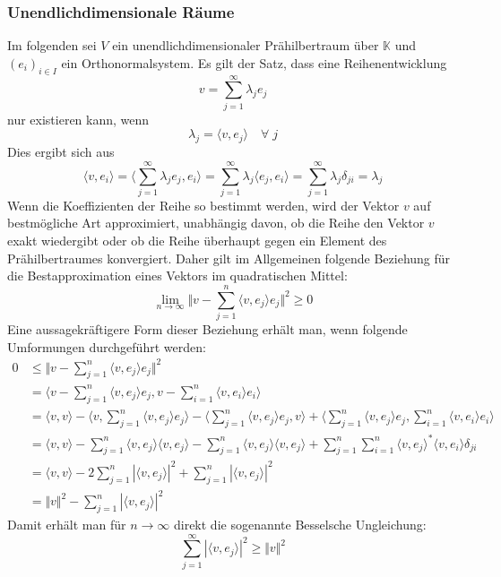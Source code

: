 \documentclass[9pt]{report}
\begin{document}
\subsubsection{Unendlichdimensionale Räume}
Im folgenden sei $V$ ein unendlichdimensionaler Prähilbertraum über $\mathbb{K}$ und $(e_i)_{i\in I}$ ein Orthonormalsystem. Es gilt der Satz, dass eine Reihenentwicklung
\begin{equation}
v=\sum_{j=1}^{\infty}\lambda_{j}e_{j}
\end{equation}
nur existieren kann, wenn
\begin{equation}
\lambda_{j}=\langle v, e_j\rangle\quad\forall\;j
\end{equation}
Dies ergibt sich aus
\begin{equation}
\langle v,e_i\rangle =\bigg\langle\sum_{j=1}^{\infty}\lambda_{j}e_{j},e_{i}\bigg\rangle =\sum_{j=1}^{\infty}\lambda_{j}\langle e_j,e_i\rangle =\sum_{j=1}^{\infty}\lambda_{j}\delta_{ji}=\lambda_j
\end{equation}
Wenn die Koeffizienten der Reihe so bestimmt werden, wird der Vektor $v$ auf bestmögliche Art approximiert, unabhängig davon, ob die Reihe den Vektor $v$ exakt wiedergibt oder ob die Reihe überhaupt gegen ein Element des Prähilbertraumes konvergiert. Daher gilt im Allgemeinen folgende Beziehung für die Bestapproximation eines Vektors im quadratischen Mittel:
\begin{equation}
\lim_{n\to\infty}\bigg\Vert v-\sum_{j=1}^{n}\langle v,e_j\rangle e_j\bigg\Vert^{2}\geq 0
\end{equation}
Eine aussagekräftigere Form dieser Beziehung erhält man, wenn folgende Umformungen durchgeführt werden:
\begin{align}
0&\leq\bigg\Vert v-\sum_{j=1}^{n}\langle v,e_j\rangle e_j\bigg\Vert^{2}\\
&=\bigg\langle v-\sum_{j=1}^{n}\langle v,e_j\rangle e_j,v-\sum_{i=1}^{n}\langle v,e_{i}\rangle e_i\bigg\rangle\\
&=\langle v,v\rangle-\bigg\langle v,\sum_{j=1}^{n}\langle v,e_j\rangle e_j\bigg\rangle-\bigg\langle\sum_{j=1}^{n}\langle v,e_j\rangle e_j,v\bigg\rangle+\bigg\langle\sum_{j=1}^{n}\langle v,e_j\rangle e_j,\sum_{i=1}^{n}\langle v,e_i\rangle e_i\bigg\rangle\\
&=\langle v,v\rangle-\sum_{j=1}^{n}\langle v,e_j\rangle\langle v,e_j\rangle-\sum_{j=1}^{n}\langle v,e_j\rangle\langle v,e_j\rangle+\sum_{j=1}^{n}\sum_{i=1}^{n}\langle v,e_j\rangle^{*}\langle v,e_i\rangle\delta_{ji}\\
&=\langle v,v\rangle-2\sum_{j=1}^{n}|\langle v,e_j\rangle|^{2}+\sum_{j=1}^{n}|\langle v,e_j\rangle|^{2}\\
&=\Vert v\Vert^2-\sum_{j=1}^{n}|\langle v,e_j\rangle|^{2}
\end{align}
Damit erhält man für $n\to\infty$ direkt die sogenannte Besselsche Ungleichung:
\begin{equation}
\sum_{j=1}^{\infty}|\langle v,e_j\rangle|^{2}\geq\Vert v\Vert^2
\end{equation}
\end{document}
